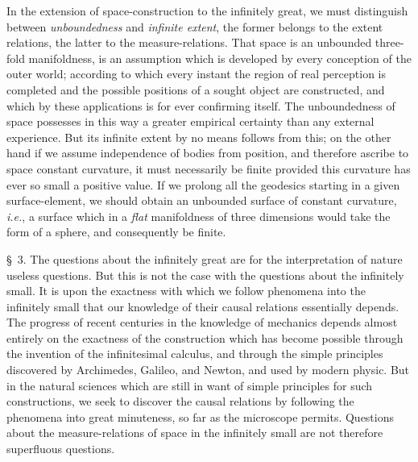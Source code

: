 \documentclass[a4paper,12pt]{article}
\begin{document}
In the extension of space-construction to the infinitely great,
we must distinguish between \emph{unboundedness} and
\emph{infinite extent}, the former belongs to the extent
relations, the latter to the measure-relations.  That space is an
unbounded three-fold manifoldness, is an assumption which is
developed by every conception of the outer world; according to
which every instant the region of real perception is completed
and the possible positions of a sought object are constructed,
and which by these applications is for ever confirming itself.
The unboundedness of space possesses in this way a greater
empirical certainty than any external experience. But its
infinite extent by no means follows from this; on the other hand
if we assume independence of bodies from position, and therefore
ascribe to space constant curvature, it must necessarily be
finite provided this curvature has ever so small a positive
value.  If we prolong all the geodesics starting in a given
surface-element, we should obtain an unbounded surface of constant
curvature, \emph{i.e.}, a surface which in a \emph{flat}
manifoldness of three dimensions would take the form of a sphere,
and consequently be finite.

\S~3.
The questions about the infinitely great are for the
interpretation of nature useless questions.  But this is not the
case with the questions about the infinitely small.  It is upon
the exactness with which we follow phenomena into the infinitely
small that our knowledge of their causal relations essentially
depends.  The progress of recent centuries in the knowledge of
mechanics depends almost entirely on the exactness of the
construction which has become possible through the invention of
the infinitesimal calculus, and through the simple principles
discovered by Archimedes, Galileo, and Newton, and used by modern
physic.  But in the natural sciences which are still in want of
simple principles for such constructions, we seek to discover the
causal relations by following the phenomena into great
minuteness, so far as the microscope permits.  Questions about
the measure-relations of space in the infinitely small are not
therefore superfluous questions.
\end{document}
